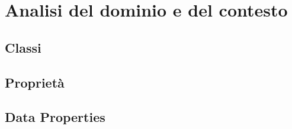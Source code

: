 \chapter{Analisi del dominio e del contesto}

\section{Classi}

\section{Proprietà}

\section{Data Properties}